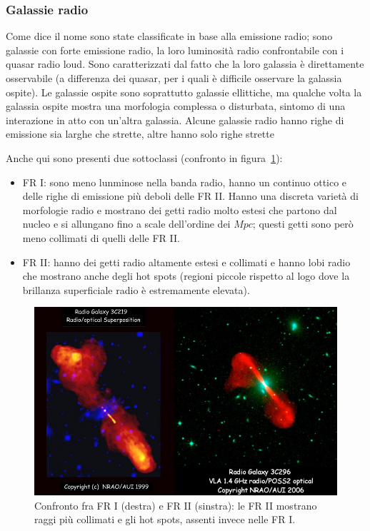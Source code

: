\subsubsection{Galassie radio}
Come dice il nome sono state classificate in base alla emissione radio; sono galassie con forte emissione radio, la loro luminosità radio confrontabile con i quasar radio loud. Sono caratterizzati dal fatto che la loro galassia è direttamente osservabile (a differenza dei quasar, per i quali è difficile osservare la galassia ospite). Le galassie ospite sono soprattutto galassie ellittiche, ma qualche volta la galassia ospite mostra una morfologia complessa o disturbata, sintomo di una interazione in atto con un'altra galassia. Alcune galassie radio hanno righe di emissione sia larghe che strette, altre hanno solo righe strette 

Anche qui sono presenti due sottoclassi (confronto in figura~\ref{fig:galassie-radio}):
\begin{itemize}
    \item FR I: sono meno lunminose nella banda radio, hanno un continuo ottico e delle righe di emissione più deboli delle FR II. Hanno una discreta varietà di morfologie radio e mostrano dei getti radio molto estesi che partono dal nucleo e si allungano fino a scale dell’ordine dei $\si{Mpc}$; questi getti sono però meno collimati di quelli delle FR II.  
    \item FR II: hanno dei getti radio altamente estesi e collimati e hanno lobi radio che mostrano anche degli hot spots (regioni piccole rispetto al logo dove la brillanza superficiale radio è estremamente elevata). 
\end{itemize}

\begin{figure}
    \centering
    \includegraphics[width = 0.8 \textwidth]{immagini/galassie-radio.png}
    \caption{Confronto fra FR I (destra) e FR II (sinstra): le FR II mostrano raggi più collimati e gli hot spots, assenti invece nelle FR I.}
    \label{fig:galassie-radio}
\end{figure}

